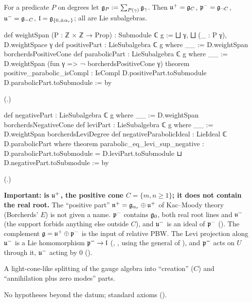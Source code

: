 \begin{definition}\label{ch18:def:parabolic}
For a predicate $P$ on degrees let $\mathfrak{g}_P:=\sum_{P(\gamma)}\mathfrak{g}_\gamma$.  Then $\mathfrak{u}^+=\mathfrak{g}_{C}$, $\mathfrak{p}^-=\mathfrak{g}_{\neg C}$, $\mathfrak{u}^-=\mathfrak{g}_{-C}$,
$\mathfrak{l}=\mathfrak{g}_{\{0,\pm\alpha_r\}}$; all are Lie subalgebras.
\end{definition}
\begin{leancode}
def weightSpan (P : ℤ × ℤ → Prop) : Submodule ℂ g :=
  ⨆ γ, ⨆ (_ : P γ), D.weightSpace γ
def positivePart : LieSubalgebra ℂ g where
  __ := D.weightSpan borcherdsPositiveCone
def parabolicPart : LieSubalgebra ℂ g where
  __ := D.weightSpan (fun γ => ¬ borcherdsPositiveCone γ)
theorem positive_parabolic_isCompl :
    IsCompl D.positivePart.toSubmodule D.parabolicPart.toSubmodule := by
\end{leancode}
(.)
\begin{leancode}
def negativePart : LieSubalgebra ℂ g where
  __ := D.weightSpan borcherdsNegativeCone
def leviPart : LieSubalgebra ℂ g where
  __ := D.weightSpan borcherdsLeviDegree
def negativeParabolicIdeal : LieIdeal ℂ D.parabolicPart where
theorem parabolic_eq_levi_sup_negative : D.parabolicPart.toSubmodule =
    D.leviPart.toSubmodule ⊔ D.negativePart.toSubmodule := by
\end{leancode}
(.)
\begin{dictionary}
\textbf{Important:  is $\mathfrak{u}^+$, the positive cone $C=\{m,n\ge1\}$; it does not contain the real root.}
The ``positive part'' $\mathfrak n^+=\mathfrak{g}_{\alpha_r}\oplus\mathfrak{u}^+$ of Kac--Moody theory (Borcherds' $E$) is not given a name.  $\mathfrak{p}^-$
contains $\mathfrak{g}_0$, both real root lines and $\mathfrak{u}^-$ (the support forbids anything else outside $C$), and
$\mathfrak{u}^-$ is an ideal of $\mathfrak{p}^-$ ().  The complement $\mathfrak{g}=\mathfrak{u}^+\oplus\mathfrak{p}^-$ is the input of relative PBW.
The Levi projection along $\mathfrak{u}^-$ is a Lie homomorphism $\mathfrak{p}^-\to\mathfrak{l}$ (,
, using the general
 of ), and $\mathfrak{p}^-$ acts on $U$ through
it, $\mathfrak{u}^-$ acting by $0$ ().
\end{dictionary}
\begin{physics}A light-cone-like splitting of the gauge algebra into ``creation'' ($C$) and ``annihilation plus zero modes'' parts.\end{physics}
\begin{status}No hypotheses beyond the datum; standard axioms ().\end{status}

